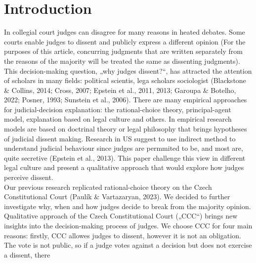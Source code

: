 \documentclass[
  11pt,
]{article}
\begin{document}
\vskip -8.5pt

{
\hypersetup{linkcolor=black}
\setcounter{tocdepth}{2}
\tableofcontents
}


{
\setcounter{tocdepth}{2}
\tableofcontents
}

\setlength{\parindent}{16pt}
\setlength{\parskip}{0pt}

\doublespacing
\hypertarget{introduction}{%
\section{Introduction}\label{introduction}}

In collegial court judges can disagree for many reasons in heated
debates. Some courts enable judges to dissent and publicly express a
different opinion (For the purposes of this article, concurring
judgments that are written separately from the reasons of the majority
will be treated the same as dissenting judgments). This decision-making
question, „why judges dissent?{}``, has attracted the attention of
scholars in many fields: political scientis, lega scholars sociologist
(Blackstone \& Collins, 2014; Cross, 2007; Epstein et al., 2011, 2013;
Garoupa \& Botelho, 2022; Posner, 1993; Sunstein et al., 2006). There
are many empirical approaches for judicial-decision explanation: the
rational-choice theory, principal-agent model, explanation based on
legal culture and others. In empirical research models are based on
doctrinal theory or legal philosophy that brings hypotheses of judicial
dissent making. Research in US suggest to use indirect method to
understand judicial behaviour since judges are permmited to be, and most
are, quite secretive (Epstein et al., 2013). This paper challenge this
view in different legal culture and present a qualitative approach that
would explore how judges perceive dissent.\\
Our previous research replicated rational-choice theory on the Czech
Constitutional Court (Paulík \& Vartazaryan, 2023). We decided to
further investigate why, when and how judges decide to break from the
majority opinion. Qualitative approach of the Czech Constitutional Court
(„CCC``) brings new insights into the decision-making process of judges.
We choose CCC for four main reasons: firstly, CCC allowes judges to
dissent, however it is not an obligation. The vote is not public, so if
a judge votes against a decision but does not exercise a dissent, there
\end{document}
